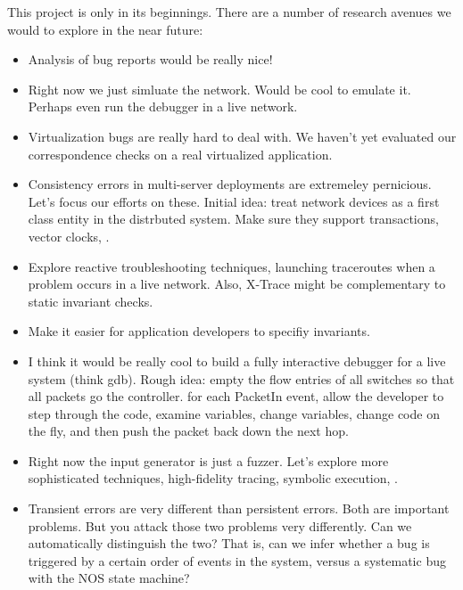 
This project is only in its beginnings. There are a number of research
avenues we would to explore in the near future:

\begin{itemize}
\item Analysis of bug reports would be really nice!
\item Right now we just simluate the network. Would be cool to emulate it.
Perhaps even run the debugger in a live network.
\item Virtualization bugs are really hard to deal with. We haven't yet evaluated
our correspondence checks on a real virtualized application.
\item Consistency errors in multi-server deployments are extremeley
pernicious. Let's focus our efforts on these. Initial idea: treat network
devices as a first class entity in the distrbuted system. Make sure they
support transactions, vector clocks, \etc.
\item Explore reactive troubleshooting techniques, \eg launching traceroutes
when a problem occurs in a live network. Also, X-Trace might be complementary
to static invariant checks. 
\item Make it easier for application developers to specifiy invariants.
\item I think it would be really cool to build a fully interactive debugger
for a live system (think gdb). Rough idea: empty the flow entries of all switches so that
all packets go the controller. for each PacketIn event, allow the developer to
step through the code, examine variables, change variables, change code on the
fly, and then push the packet back down the next hop.
\item Right now the input generator is just a fuzzer. Let's explore more
sophisticated techniques, \eg high-fidelity tracing, symbolic execution, \etc.
\item Transient errors are very different than persistent errors. Both are
important problems. But you attack those two problems very differently. Can we
automatically distinguish the two? That is, can we infer whether a bug is
triggered by a certain order of events in the system, versus a systematic bug
with the NOS state machine?
\end{itemize}
